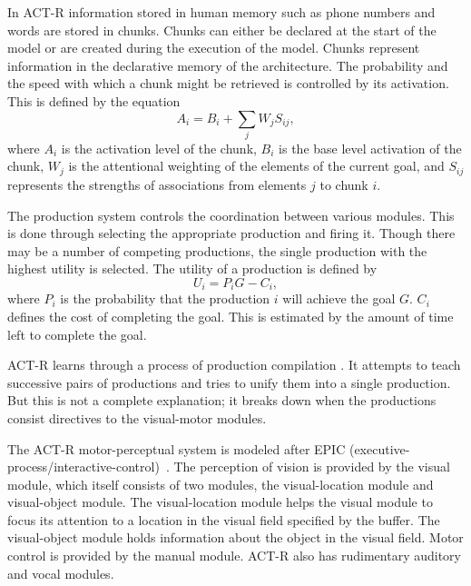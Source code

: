 In ACT-R information stored in human memory such as phone numbers and
words are stored in chunks. Chunks can either be declared at the start
of the model or are created during the execution of the model. Chunks
represent information in the declarative memory of the architecture. The
probability and the speed with which a chunk might be retrieved is
controlled by its activation. This is defined by the equation
%
\begin{equation}
  A_i = B_i + \sum_j W_j S_{ij},
\end{equation}
%
where $A_i$ is the activation level of the chunk, $B_i$ is the base
level activation of the chunk, $W_j$ is the attentional weighting of
the elements of the current goal, and $S_{ij}$ represents the strengths
of associations from elements $j$ to chunk $i$.

The production system controls the coordination between various
modules.  This is done through selecting the appropriate production
and firing it. Though there may be a number of competing productions,
the single production with the highest utility is selected.  The
utility of a production is defined by
%
\begin{equation}
  U_i = P_iG - C_i,
\end{equation}
%
where $P_i$ is the probability that the production $i$ will achieve
the goal $G$.  $C_i$ defines the cost of completing the goal. This is
estimated by the amount of time left to complete the goal.

ACT-R learns through a process of production compilation
\cite{oai:CiteSeerPSU:518586}. It attempts to teach successive pairs
of productions and tries to unify them into a single production. But
this is not a complete explanation; it breaks down when the
productions consist directives to the visual-motor modules.


The ACT-R motor-perceptual system is modeled after EPIC
(executive-process/interactive-control)~\cite{kieras1997overview}. The
perception of vision is provided by the visual module, which itself
consists of two modules, the visual-location module and visual-object
module. The visual-location module helps the visual module to focus
its attention to a location in the visual field specified by the
buffer. The visual-object module holds information about the object in
the visual field. Motor control is provided by the manual
module. ACT-R also has rudimentary auditory and vocal
modules\cite{anderson_jr-etal:2004a}.

